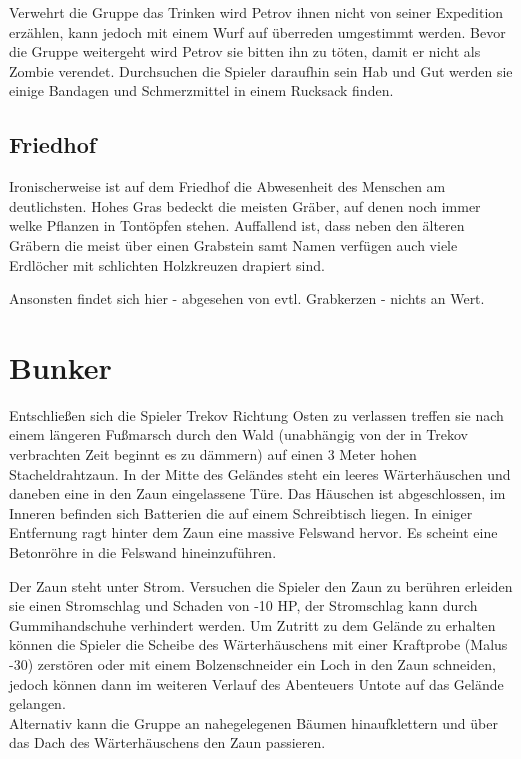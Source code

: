 \documentclass{include/protokollclass}
\begin{document}
Verwehrt die Gruppe das Trinken wird Petrov ihnen nicht von seiner Expedition erzählen, kann jedoch mit einem Wurf auf überreden umgestimmt werden. Bevor die Gruppe weitergeht wird Petrov sie bitten ihn zu töten, damit er nicht als Zombie verendet.
Durchsuchen die Spieler daraufhin sein Hab und Gut werden sie einige Bandagen und Schmerzmittel in einem Rucksack finden.

\subsection{Friedhof}
Ironischerweise ist auf dem Friedhof die Abwesenheit des Menschen am deutlichsten. Hohes Gras bedeckt die meisten Gräber, auf denen noch immer welke Pflanzen in Tontöpfen stehen. Auffallend ist, dass neben den älteren Gräbern die meist über einen Grabstein samt Namen verfügen auch viele Erdlöcher mit schlichten Holzkreuzen drapiert sind.

Ansonsten findet sich hier - abgesehen von evtl. Grabkerzen - nichts an Wert.

\section{Bunker}

Entschließen sich die Spieler Trekov Richtung Osten zu verlassen treffen sie nach einem längeren Fußmarsch durch den Wald (unabhängig von der in Trekov verbrachten Zeit beginnt es zu dämmern) auf einen 3 Meter hohen Stacheldrahtzaun.
In der Mitte des Geländes steht ein leeres Wärterhäuschen und daneben eine in den Zaun eingelassene Türe. Das Häuschen ist abgeschlossen, im Inneren befinden sich Batterien die auf einem Schreibtisch liegen.
In einiger Entfernung ragt hinter dem Zaun eine massive Felswand hervor. Es scheint eine Betonröhre in die Felswand hineinzuführen.

Der Zaun steht unter Strom. Versuchen die Spieler den Zaun zu berühren erleiden sie einen Stromschlag und Schaden von -10 HP, der Stromschlag kann durch Gummihandschuhe verhindert werden.
Um Zutritt zu dem Gelände zu erhalten können die Spieler die Scheibe des Wärterhäuschens mit einer Kraftprobe (Malus -30) zerstören oder mit einem Bolzenschneider ein Loch in den Zaun schneiden, jedoch können dann im weiteren Verlauf des Abenteuers Untote auf das Gelände gelangen.
\\Alternativ kann die Gruppe an nahegelegenen Bäumen hinaufklettern und über das Dach des Wärterhäuschens den Zaun passieren.
\end{document}
